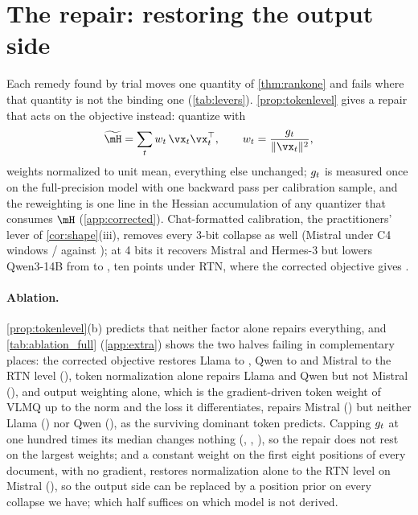 \section{The repair: restoring the output side}
\label{sec:corrected}
Each remedy found by trial moves one quantity of \cref{thm:rankone} and fails where that quantity is not the binding one (\cref{tab:levers}).
\cref{prop:tokenlevel} gives a repair that acts on the objective instead: quantize with
\begin{equation}
\label{eq:corrected}
\hessw=\sum_t \wtok\,\vx_t\vx_t^\top,\qquad \wtok=\frac{\gsens}{\|\vx_t\|^2},
\end{equation}
weights normalized to unit mean, everything else unchanged; $g_t$ is measured once on the full-precision model with one backward pass per calibration sample, and the reweighting is one line in the Hessian accumulation of any quantizer that consumes $\hess$ (\cref{app:corrected}).
Chat-formatted calibration, the practitioners' lever of \cref{cor:shape}(iii), removes every 3-bit collapse as well (Mistral under C4 windows \McchatIF{} / \MuchatIF{} against \McorrIF{}); at 4 bits it recovers Mistral and Hermes-3 but lowers Qwen3-14B from \QthreeFourGptqIF{} to \QthreeFourChatIF{}, ten points under RTN, where the corrected objective gives \QthreeFourCorrIF{}.

\paragraph{Ablation.}
\cref{prop:tokenlevel}(b) predicts that neither factor alone repairs everything, and \cref{tab:ablation_full} (\cref{app:extra}) shows the two halves failing in complementary places: the corrected objective restores Llama to \LcorrIF{}, Qwen to \QcorrIF{} and Mistral to the RTN level (\McorrIF{}), token normalization alone repairs Llama and Qwen but not Mistral (\MtnormIF{}), and output weighting alone, which is the gradient-driven token weight of VLMQ \citep{xue2025vlmq} up to the norm and the loss it differentiates, repairs Mistral (\MgonlyIF{}) but neither Llama (\LgonlyIF{}) nor Qwen (\QgonlyIF{}), as the surviving dominant token predicts.
Capping $g_t$ at one hundred times its median changes nothing (\LcorrCapIF{}, \QcorrCapIF{}, \McorrCapIF{}), so the repair does not rest on the largest weights; and a constant weight on the first eight positions of every document, with no gradient, restores normalization alone to the RTN level on Mistral (\MposTenIF{}), so the output side can be replaced by a position prior on every collapse we have; which half suffices on which model is not derived.

